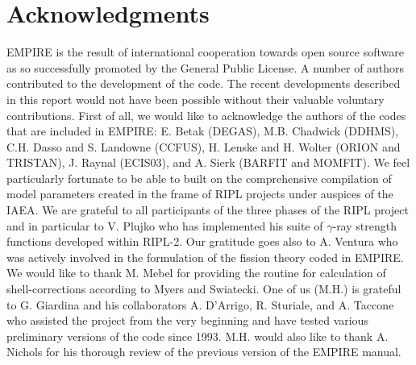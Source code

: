 \section*{Acknowledgments}

EMPIRE is the result of international cooperation towards open source
software as so successfully promoted by the General Public License. A number
of authors contributed to the development of the code. The recent
developments described in this report would not have been possible without
their valuable voluntary contributions. First of all, we would like to
acknowledge the authors of the codes that are included in EMPIRE: E. Betak
(DEGAS), M.B. Chadwick (DDHMS), C.H. Dasso and S. Landowne (CCFUS), H.
Lenske and H. Wolter (ORION and TRISTAN), J. Raynal (ECIS03), and A. Sierk
(BARFIT and MOMFIT). We feel particularly fortunate to be able to built on
the comprehensive compilation of model parameters created in the frame of
RIPL projects under auspices of the IAEA. We are grateful to all
participants of the three phases of the RIPL project and in particular to V.
Plujko who has implemented his suite of $\gamma$-ray strength functions
developed within RIPL-2. Our gratitude goes also to A. Ventura who was
actively involved in the formulation of the fission theory coded in EMPIRE.
We would like to thank M. Mebel for providing the routine for calculation of
shell-corrections according to Myers and Swiatecki. One of us (M.H.) is
grateful to G. Giardina and his collaborators A. D'Arrigo, R. Sturiale, and
A. Taccone who assisted the project from the very beginning and have tested
various preliminary versions of the code since 1993. M.H. would also like to
thank A. Nichols for his thorough review of the previous version of the
EMPIRE manual.




